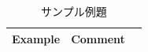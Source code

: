 \begin{table}[htdp]
\caption{サンプル例題}
\begin{center}
\small
\begin{tabular}{lll} \toprule
Example & Comment\\ \midrule
\end{tabular}
\end{center}
\label{tbl:exercise}
\end{table}

